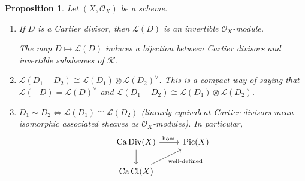 \documentclass[12pt]{article}
\DeclareMathOperator{\Pic}{Pic}
\DeclareMathOperator{\Div}{Div}
\DeclareMathOperator{\Cl}{Cl}
\DeclareMathOperator{\Ca}{Ca}
\newtheorem*{proposition}{Proposition}
\theoremstyle{definition}
\begin{document}
\begin{proposition}
Let $(X,\mathcal O_X)$ be a scheme.

\begin{enumerate}[label=\roman*)]
\item If $D$ is a Cartier divisor, then $\mathcal L(D)$ is an invertible $\mathcal O_X$-module.

The map $D\mapsto\mathcal L(D)$ induces a bijection between Cartier divisors and invertible subsheaves of $\mathcal K$.

\item\label{menos_dual} $\mathcal L(D_1-D_2)\cong\mathcal L(D_1)\otimes\mathcal L(D_2)^\vee$. This is a compact way of saying that $\mathcal L(-D)=\mathcal L(D)^\vee$ and $\mathcal L(D_1+D_2)\cong\mathcal L(D_1)\otimes\mathcal L(D_2)$.

\item $D_1\sim D_2\Leftrightarrow\mathcal L(D_1)\cong\mathcal L(D_2)$ (linearly equivalent Cartier divisors mean isomorphic associated sheaves as $\mathcal O_X$-modules). In particular,
\[\begin{tikzcd}\Ca\Div(X)\arrow[r,"\text{hom.}"]\arrow[d]&\Pic(X)\\\Ca\Cl(X)\arrow[ru,"\text{well-defined}",swap]\end{tikzcd}\]
\end{enumerate}
\end{proposition}
\end{document}
